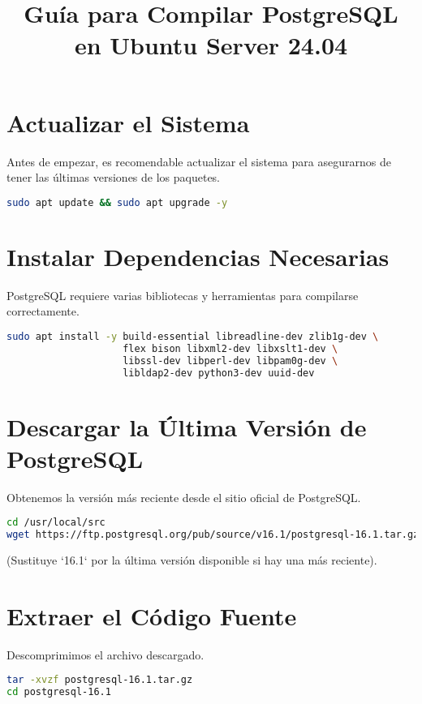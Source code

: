 \documentclass{article}
\title{Gu\'ia para Compilar PostgreSQL en Ubuntu Server 24.04}
\author{}
\date{}
\begin{document}
\maketitle

\section{Actualizar el Sistema}
Antes de empezar, es recomendable actualizar el sistema para asegurarnos de tener las últimas versiones de los paquetes.

\begin{lstlisting}[language=bash]
sudo apt update && sudo apt upgrade -y
\end{lstlisting}

\section{Instalar Dependencias Necesarias}
PostgreSQL requiere varias bibliotecas y herramientas para compilarse correctamente.

\begin{lstlisting}[language=bash]
sudo apt install -y build-essential libreadline-dev zlib1g-dev \
                    flex bison libxml2-dev libxslt1-dev \
                    libssl-dev libperl-dev libpam0g-dev \
                    libldap2-dev python3-dev uuid-dev
\end{lstlisting}

\section{Descargar la Última Versión de PostgreSQL}
Obtenemos la versión más reciente desde el sitio oficial de PostgreSQL.

\begin{lstlisting}[language=bash]
cd /usr/local/src
wget https://ftp.postgresql.org/pub/source/v16.1/postgresql-16.1.tar.gz
\end{lstlisting}
(Sustituye `16.1` por la última versión disponible si hay una más reciente).

\section{Extraer el Código Fuente}
Descomprimimos el archivo descargado.

\begin{lstlisting}[language=bash]
tar -xvzf postgresql-16.1.tar.gz
cd postgresql-16.1
\end{lstlisting}
\end{document}
